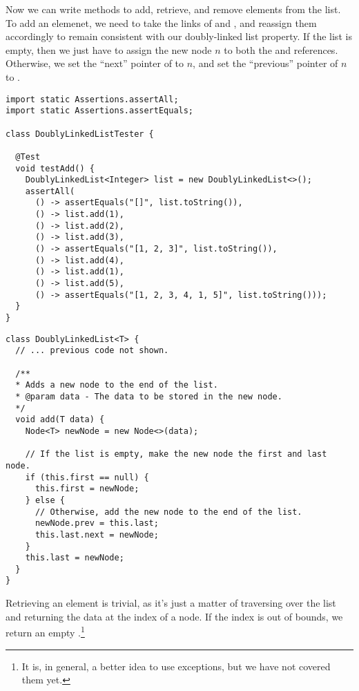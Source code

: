 Now we can write methods to add, retrieve, and remove elements from the list. To add an elemenet, we need to take the links of  and , and reassign them accordingly to remain consistent with our doubly-linked list property. If the list is empty, then we just have to assign the new node $n$ to both the  and  references. Otherwise, we set the ``next'' pointer of  to $n$, and set the ``previous'' pointer of $n$ to . 

\begin{lstlisting}[language=MyJava]
import static Assertions.assertAll;
import static Assertions.assertEquals;

class DoublyLinkedListTester {

  @Test
  void testAdd() {
    DoublyLinkedList<Integer> list = new DoublyLinkedList<>();
    assertAll(
      () -> assertEquals("[]", list.toString()),
      () -> list.add(1),
      () -> list.add(2),
      () -> list.add(3),
      () -> assertEquals("[1, 2, 3]", list.toString()),
      () -> list.add(4),
      () -> list.add(1),
      () -> list.add(5),
      () -> assertEquals("[1, 2, 3, 4, 1, 5]", list.toString()));
  }
}
\end{lstlisting}

\begin{lstlisting}[language=MyJava]
class DoublyLinkedList<T> {
  // ... previous code not shown.

  /**
  * Adds a new node to the end of the list.
  * @param data - The data to be stored in the new node.
  */
  void add(T data) {
    Node<T> newNode = new Node<>(data);

    // If the list is empty, make the new node the first and last node.
    if (this.first == null) {
      this.first = newNode;
    } else {
      // Otherwise, add the new node to the end of the list.
      newNode.prev = this.last;
      this.last.next = newNode;
    }
    this.last = newNode;
  }
}
\end{lstlisting}

Retrieving an element is trivial, as it's just a matter of traversing over the list and returning the data at the index of a node. If the index is out of bounds, we return an empty .\footnote{It is, in general, a better idea to use exceptions, but we have not covered them yet.}

